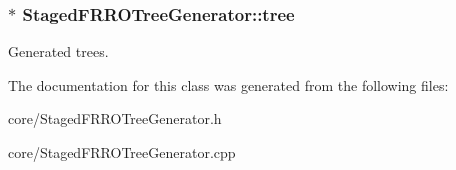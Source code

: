 \subsubsection[{\texorpdfstring{tree}{tree}}]{$\ast$ Staged\+F\+R\+R\+O\+Tree\+Generator\+::tree\hspace{0.3cm}{\ttfamily [private]}}\hypertarget{class_staged_f_r_r_o_tree_generator_a3d7a0b0194b93d4c2706a21908ad9f09}{}\label{class_staged_f_r_r_o_tree_generator_a3d7a0b0194b93d4c2706a21908ad9f09}
Generated trees. 

The documentation for this class was generated from the following files\+:\begin{DoxyCompactItemize}
\item 
core/Staged\+F\+R\+R\+O\+Tree\+Generator.\+h\item 
core/Staged\+F\+R\+R\+O\+Tree\+Generator.\+cpp\end{DoxyCompactItemize}
